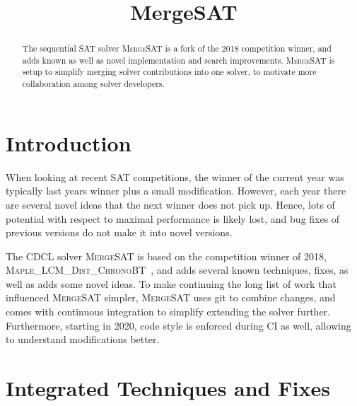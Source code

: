\documentclass[conference]{IEEEtran}
\begin{document}
	
\title{MergeSAT}

\author{
}

\maketitle

\def\coprocessor{\textsc{Coprocessor}\xspace}
\def\glucose{\textsc{Glucose~2.2}\xspace}
\def\minisat{\textsc{Minisat~2.2}\xspace}
\def\riss{\textsc{Riss}\xspace}
\def\mergesat{\textsc{MergeSAT}\xspace}

\begin{abstract}
The sequential SAT solver \mergesat is a fork of the 2018 competition winner, and adds known as well as novel implementation and search improvements.
\mergesat is setup to simplify merging solver contributions into one solver, to motivate more collaboration among solver developers.
\end{abstract}


\section{Introduction}

When looking at recent SAT competitions, the winner of the current year was typically last years winner plus a small modification.
However, each year there are several novel ideas that the next winner does not pick up.
Hence, lots of potential with respect to maximal performance is likely lost, and bug fixes of previous versions do not make it into novel versions.

The CDCL solver \mergesat is based on the competition winner of 2018, \textsc{Maple\_LCM\_Dist\_ChronoBT}~\cite{MapleLCMDistChronoBT}, and adds several known techniques, fixes, as well as adds some novel ideas.
To make continuing the long list of work that influenced \mergesat simpler, \mergesat uses git to combine changes,
and comes with continuous integration to simplify extending the solver further.
Furthermore, starting in 2020, code style is enforced during CI as well, allowing to understand modifications better.

\section{Integrated Techniques and Fixes}
\end{document}
